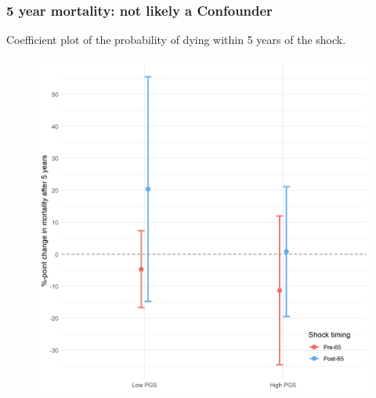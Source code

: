 \documentclass[10pt,compress,xcolor=dvipsnames]{beamer}    %
\newcounter{ex}
\newcommand{\1}[1]{\mathrm{1\hspace*{-2.5pt}l}[#1]}	%
\begin{document}
\begin{frame}
\frametitle{5 year mortality: not likely a Confounder}
Coefficient plot of the probability of dying within 5 years of the shock.
\begin{figure}[hbtp]
\centering
\includegraphics[height=0.8\textheight]{../../3_output/shock_effects/dead5_6070_100_cvplot.png}
\label{fig:dead5}
\end{figure}
\end{frame}

\end{document}
